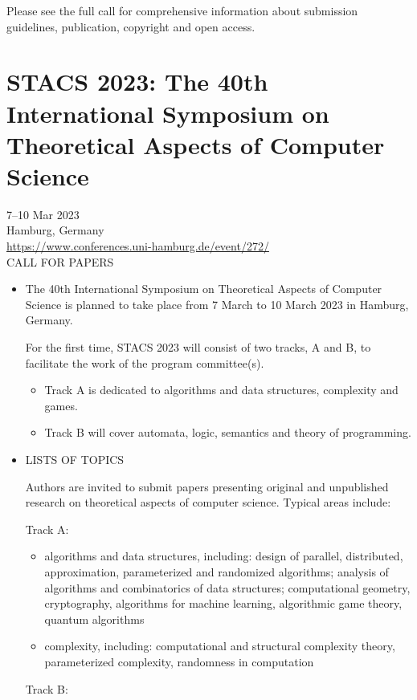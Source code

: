\documentclass[prodmode,acmtecs]{acmsmall} %
\begin{document}
\begin{itemize}
  Please see the full call for comprehensive information about submission guidelines, publication, copyright and open access. 
 
\end{itemize}\section{STACS 2023: The 40th International Symposium on Theoretical Aspects of Computer Science}\label{STACS2023}  7–10 Mar 2023 \\ 
  Hamburg, Germany\\ 
  \href{https://www.conferences.uni-hamburg.de/event/272/}{https://www.conferences.uni-hamburg.de/event/272/}\\ 
CALL FOR PAPERS 

\begin{itemize}\item   The 40th International Symposium on Theoretical Aspects of Computer Science is planned to take place from 7 March to 10 March 2023 in Hamburg, Germany.  
 
  For the first time, STACS 2023 will consist of two tracks, A and B, to facilitate the work of the program committee(s). 
 
\begin{itemize}\item  Track A is dedicated to algorithms and data structures, complexity and games.
\item  Track B will cover automata, logic, semantics and theory of programming.
\end{itemize} 
\item  LISTS OF TOPICS 
 
  Authors are invited to submit papers presenting original and unpublished research on theoretical aspects of computer science. Typical areas include: 
 
  Track A:  
 
\begin{itemize}\item  algorithms and data structures, including: design of parallel, distributed, approximation, parameterized and randomized algorithms; analysis of algorithms and combinatorics of data structures; computational geometry, cryptography, algorithms for machine learning, algorithmic game theory, quantum algorithms 
\item  complexity, including: computational and structural complexity theory, parameterized complexity, randomness in computation 
\end{itemize} 
  Track B: 
 

\end{itemize}
\end{document}
